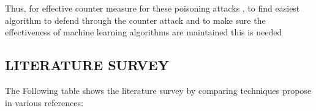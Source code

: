 \documentclass[a4paper, 12pt]{article}
\begin{document}
\hspace{1cm} Thus, for effective counter measure for these poisoning attacks , to find easiest algorithm to defend through the counter attack and to make sure the effectiveness of machine learning algorithms are  maintained this is needed\\

\newpage
\begin{center}

\section{LITERATURE SURVEY}

\end{center}

The Following table shows the literature survey by comparing techniques propose in various references:
\end{document}
